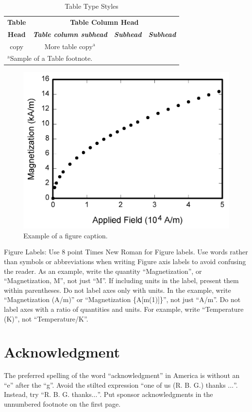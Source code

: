 \documentclass[conference]{IEEEtran}
\begin{document}
\begin{table}[htbp]
\caption{Table Type Styles}
\begin{center}
\begin{tabular}{|c|c|c|c|}
\hline
\textbf{Table}&\multicolumn{3}{|c|}{\textbf{Table Column Head}} \\
\cline{2-4} 
\textbf{Head} & \textbf{\textit{Table column subhead}}& \textbf{\textit{Subhead}}& \textbf{\textit{Subhead}} \\
\hline
copy& More table copy$^{\mathrm{a}}$& &  \\
\hline
\multicolumn{4}{l}{$^{\mathrm{a}}$Sample of a Table footnote.}
\end{tabular}
\label{tab1}
\end{center}
\end{table}

\begin{figure}[htbp]
\centerline{\includegraphics{fig1.png}}
\caption{Example of a figure caption.}
\label{fig}
\end{figure}

Figure Labels: Use 8 point Times New Roman for Figure labels. Use words 
rather than symbols or abbreviations when writing Figure axis labels to 
avoid confusing the reader. As an example, write the quantity 
``Magnetization'', or ``Magnetization, M'', not just ``M''. If including 
units in the label, present them within parentheses. Do not label axes only 
with units. In the example, write ``Magnetization (A/m)'' or ``Magnetization 
\{A[m(1)]\}'', not just ``A/m''. Do not label axes with a ratio of 
quantities and units. For example, write ``Temperature (K)'', not 
``Temperature/K''.

\section*{Acknowledgment}

The preferred spelling of the word ``acknowledgment'' in America is without 
an ``e'' after the ``g''. Avoid the stilted expression ``one of us (R. B. 
G.) thanks $\ldots$''. Instead, try ``R. B. G. thanks$\ldots$''. Put sponsor 
acknowledgments in the unnumbered footnote on the first page.



\end{document}
